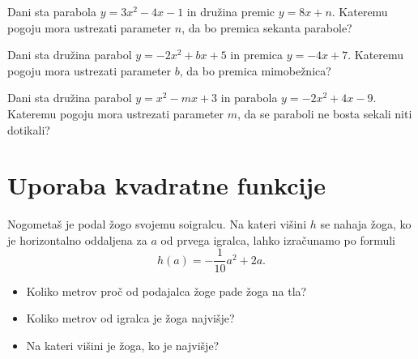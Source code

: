             


            \begin{naloga}
                Dani sta parabola $y=3x^2-4x-1$ in družina premic $y=8x+n$.
                Kateremu pogoju mora ustrezati parameter $n$, da bo premica sekanta parabole?
                                
            \end{naloga}


            \begin{naloga}
                Dani sta družina parabol $y=-2x^2+bx+5$ in premica $y=-4x+7$.
                Kateremu pogoju mora ustrezati parameter $b$, da bo premica mimobežnica?
                
            \end{naloga}


            \begin{naloga}
                Dani sta družina parabol $y=x^2-mx+3$ in parabola $y=-2x^2+4x-9$.
                Kateremu pogoju mora ustrezati parameter $m$, da  se paraboli ne bosta sekali niti dotikali?
                                                
            \end{naloga}




\newpage
    \section{Uporaba kvadratne funkcije}


        \begin{naloga}
           Nogometaš je podal žogo svojemu soigralcu.
           Na kateri višini $h$ se nahaja žoga, ko je horizontalno oddaljena za $a$ od prvega igralca, 
           lahko izračunamo po formuli $$ h(a)=-\dfrac{1}{10}a^2+2a.$$
            
            \begin{itemize}
                \item Koliko metrov proč od podajalca žoge pade žoga na tla?
                \item Koliko metrov od igralca je žoga najvišje?
                \item Na kateri višini je žoga, ko je najvišje?
            \end{itemize}
                            
        \end{naloga}




